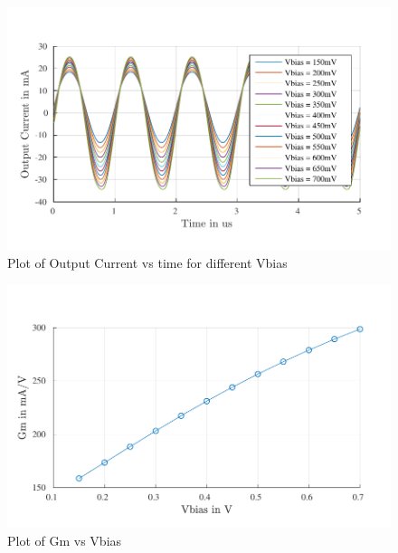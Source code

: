 \begin{figure} [H]
\centering
\includegraphics[scale=1]{Figures/Plots/Ov_Sine_Iout.pdf}
\caption{Plot of Output Current vs time for different Vbias}
\end{figure}

\begin{figure} [H]
\centering
\includegraphics[scale=1]{Figures/Plots/Ov_Gm.pdf}
\caption{Plot of Gm vs Vbias}
\end{figure}


